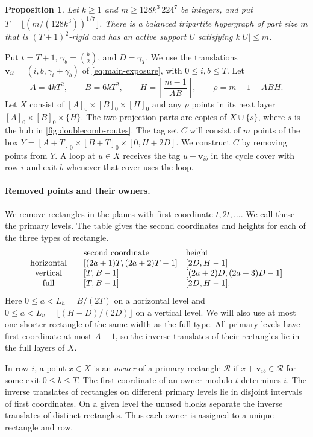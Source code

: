 \documentclass[10pt]{article}
\numberwithin{equation}{section}
\newtheorem{proposition}[proposition]{Proposition}
\theoremstyle{definition}
\begin{document}
\begin{proposition}\label{prop:rectangular-factor}
Let $k\ge1$ and $m\ge128k^3\,224^7$ be integers, and put $T=\lfloor(m/(128k^3))^{1/7}\rfloor$. There is a balanced tripartite hypergraph of part size $m$ that is $(T+1)^2$-rigid and has an active support $U$ satisfying $k|U|\le m$.
\end{proposition}

Put $t=T+1$, $\gamma_b=\binom b2$, and $D=\gamma_T$. We use the translations $\mathbf v_{ib}=(i,b,\gamma_i+\gamma_b)$ of \cref{eq:main-exposure}, with $0\le i,b\le T$. Let
\[
 A=4kT^2,\qquad B=6kT^2,\qquad
 H=\left\lfloor\frac{m-1}{AB}\right\rfloor,\qquad \rho=m-1-ABH.
\]
Let $X$ consist of $[A]_0\times[B]_0\times[H]_0$ and any $\rho$ points in its next layer $[A]_0\times[B]_0\times\{H\}$. The two projection parts are copies of $X\cup\{s\}$, where $s$ is the hub in \cref{fig:doublecomb-routes}. The tag set $C$ will consist of $m$ points of the box $Y=[A+T]_0\times[B+T]_0\times[0,H+2D]$. We construct $C$ by removing points from $Y$. A loop at $u\in X$ receives the tag $u+\mathbf v_{ib}$ in the cycle cover with row $i$ and exit $b$ whenever that cover uses the loop.

\paragraph{Removed points and their owners.}
We remove rectangles in the planes with first coordinate $t,2t,\ldots$. We call these the primary levels. The table gives the second coordinates and heights for each of the three types of rectangle.
\[
\begin{array}{c@{\qquad}ll}
 &\text{second coordinate}&\text{height}\\
 \text{horizontal}&[(2a+1)T,(2a+2)T-1]&[2D,H-1]\\
 \text{vertical}&[T,B-1]&[(2a+2)D,(2a+3)D-1]\\
 \text{full}&[T,B-1]&[2D,H-1].
\end{array}
\]
Here $0\le a<L_h=B/(2T)$ on a horizontal level and $0\le a<L_v=\lfloor(H-D)/(2D)\rfloor$ on a vertical level. We will also use at most one shorter rectangle of the same width as the full type. All primary levels have first coordinate at most $A-1$, so the inverse translates of their rectangles lie in the full layers of $X$.

In row $i$, a point $x\in X$ is an \emph{owner} of a primary rectangle $\mathcal R$ if $x+\mathbf v_{ib}\in\mathcal R$ for some exit $0\le b\le T$. The first coordinate of an owner modulo $t$ determines $i$. The inverse translates of rectangles on different primary levels lie in disjoint intervals of first coordinates. On a given level the unused blocks separate the inverse translates of distinct rectangles. Thus each owner is assigned to a unique rectangle and row.
\end{document}
